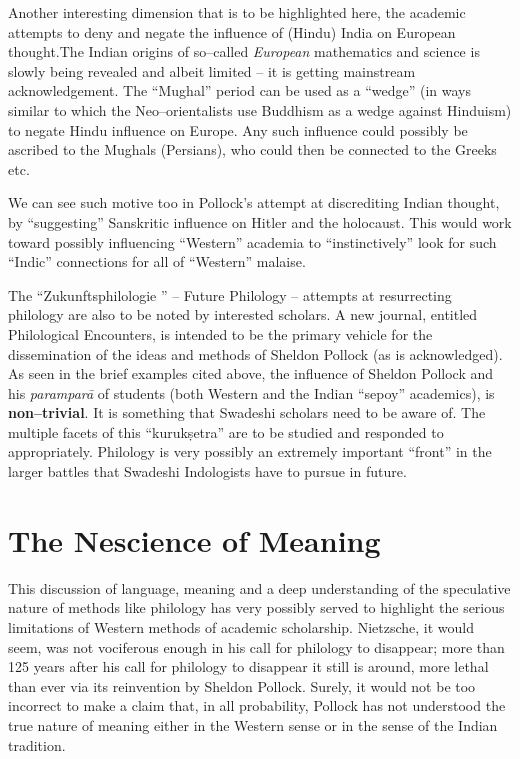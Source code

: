 Another interesting dimension that is to be highlighted here, the academic attempts to deny and negate the influence of (Hindu) India on European thought.The Indian origins of so–called \textit{European} mathematics and science is slowly being revealed and albeit limited – it is getting mainstream acknowledgement. The “Mughal” period can be used as a “wedge” (in ways similar to which the Neo–orientalists use Buddhism as a wedge against Hinduism) to negate Hindu influence on Europe. Any such influence could possibly be ascribed to the Mughals (Persians), who could then be connected to the Greeks etc.

We can see such motive too in Pollock’s attempt at discrediting Indian thought, by “suggesting” Sanskritic influence on Hitler and the holocaust. This would work toward possibly influencing “Western” academia to “instinctively” look for such “Indic” connections for all of “Western” malaise. 

The “Zukunftsphilologie ” – Future Philology – attempts at resurrecting philology are also to be noted by interested scholars. A new journal, entitled Philological Encounters, is intended to be the primary vehicle for the dissemination of the ideas and methods of Sheldon Pollock (as is acknowledged). As seen in the brief examples cited above, the influence of Sheldon Pollock and his \textit{paramparā} of students (both Western and the Indian “sepoy” academics), is \textbf{non–trivial}. It is something that Swadeshi scholars need to be aware of. The multiple facets of this “kurukṣetra” are to be studied and responded to appropriately. Philology is very possibly an extremely important “front” in the larger battles that Swadeshi Indologists have to pursue in future.

\vskip -6pt


\section*{The Nescience of Meaning}

\vskip -6pt

This discussion of language, meaning and a deep understanding of the speculative nature of methods like philology has very possibly served to highlight the serious limitations of Western methods of academic scholarship. Nietzsche, it would seem, was not vociferous enough in his call for philology to disappear; more than 125 years after his call for philology to disappear it still is around, more lethal than ever via its reinvention by Sheldon Pollock. Surely, it would not be too incorrect to make a claim that, in all probability, Pollock has not understood the true nature of meaning either in the Western sense or in the sense of the Indian tradition.

